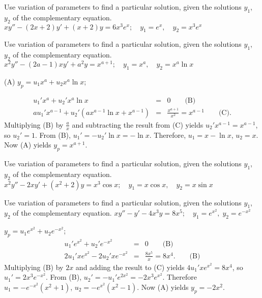 \documentclass{ximera}
\begin{document}
\begin{problem}\label{exer:5.7.15}
Use variation
of parameters to find a particular solution, given the solutions
$y_1$, $y_2$ of the complementary equation. $xy''-(2x+2)y'+(x+2)y=6x^3e^x;\quad  y_1=e^x,\quad  y_2=x^3e^x$
\end{problem}

\begin{problem}\label{exer:5.7.16}
Use variation
of parameters to find a particular solution, given the solutions
$y_1$, $y_2$ of the complementary equation. $x^2y''-(2a-1)xy'+a^2y=x^{a+1}; \quad  y_1=x^a,
\quad y_2=x^a \ln x$

\begin{solution}
(A) $y_p=u_1x^a+u_2x^a\ln x$;

\begin{eqnarray*}
u_1'x^a+u_2'x^a\ln x&=&0\qquad\text{(B)}\\ %
au_1'x^{a-1}+u_2'(ax^{a-1}\ln x+x^{a-1})&=&\frac{x^{a+1}}{x^2}=x^{a-1}\qquad\text{(C)}. %
\end{eqnarray*}
Multiplying (B) by $\frac{a}{x}$ and subtracting
the result from (C) yields $u_2'x^{a-1}=x^{a-1}$, so
$u_2'=1$. From (B), $u_1'=-u_2'\ln x=-\ln x$.
Therefore, $u_1=x-\ln x$, $u_2=x$. Now (A) yields $y_p=x^{a+1}$.
\end{solution}
\end{problem}

\begin{problem}\label{exer:5.7.17}
Use variation
of parameters to find a particular solution, given the solutions
$y_1$, $y_2$ of the complementary equation. $x^2y''-2xy'+(x^2+2)y=x^3\cos x; \quad  y_1=x\cos x,
\quad y_2=x\sin x$
\end{problem}

\begin{problem}\label{exer:5.7.18}
Use variation
of parameters to find a particular solution, given the solutions
$y_1$, $y_2$ of the complementary equation. $xy''-y'-4x^3y=8x^5;\quad  y_1=e^{x^2},\;  y_2=e^{-x^2}$

\begin{solution}
    $y_p=u_1e^{x^2}+u_2e^{-x^2}$;
\setcounter{equation}{1}
\begin{eqnarray*}
u_1'e^{x^2} +u_2'e^{-x^2}&=&0\qquad\text{(B)}\\ %
2u_1'xe^{x^2}-2u_2'xe^{-x^2}&=&\frac{8x^5}{
x}=8x^4. \qquad\text{(B)}%
\end{eqnarray*}
Multiplying (B) by $2x$ and adding the result to
(C) yields $4u_1'xe^{x^2}=8x^4$, so
$u_1'=2x^3e^{-x^2}$. From (B),
$u_2'=-u_1'e^{2x^2}=-2x^3e^{x^2}$. Therefore $u_1=-e^{-x^2}(x^2+1)$,
$u_2=-e^{x^2}(x^2-1)$. Now (A) yields $y_p=-2x^2$.
\end{solution}
\end{problem}
\end{document}

